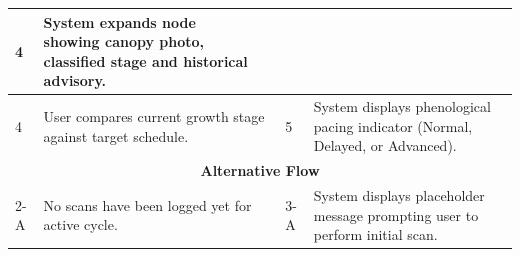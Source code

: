 \documentclass{FastFyp}
\begin{document}
\begin{table}[!ht]
\begin{tabular}{|lllll|}
  \multicolumn{1}{p{0.8cm}|}{4} &
  \multicolumn{1}{p{5.6cm}|}{System expands node showing canopy photo, classified stage and historical advisory.} \\ \hline
\multicolumn{1}{|p{0.8cm}|}{4} &
  \multicolumn{2}{p{6.0cm}|}{User compares current growth stage against target schedule.} &
  \multicolumn{1}{p{0.8cm}|}{5} &
  \multicolumn{1}{p{5.6cm}|}{System displays phenological pacing indicator (Normal, Delayed, or Advanced).} \\ \hline
\multicolumn{5}{|c|}{\textbf{Alternative Flow}} \\ \hline
\multicolumn{1}{|p{0.8cm}|}{2-A} &
  \multicolumn{2}{p{6.0cm}|}{No scans have been logged yet for active cycle.} &
  \multicolumn{1}{p{0.8cm}|}{3-A} &
  \multicolumn{1}{p{5.6cm}|}{System displays placeholder message prompting user to perform initial scan.} \\ \hline
\end{tabular}
\end{table}
\end{document}
